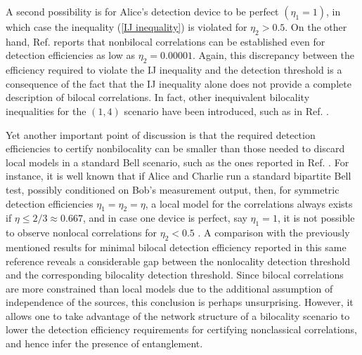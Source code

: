 \documentclass[aps,pra,reprint, superscriptaddress,showkeys]{revtex4-2}
\theoremstyle{plain}
\begin{document}
A second possibility is for Alice's detection device to be perfect $(\eta_1=1)$, in which case the inequality (\ref{IJ inequality}) is violated for $\eta_2>0.5$. On the other hand, Ref. \cite{boundingthesets} reports that nonbilocal correlations can be established even for detection efficiencies as low as $\eta_2 = 0.00001$. Again, this discrepancy between the efficiency required to violate the IJ inequality and the detection threshold is a consequence of the fact that the IJ inequality alone does not provide a complete description of bilocal correlations. In fact, other inequivalent bilocality inequalities for the $(1,4)$ scenario have been introduced, such as in Ref. \cite{tavakoli2021bilocal}. 

Yet another important point of discussion is that the required detection efficiencies to certify nonbilocality can be smaller than those needed to discard local models in a standard Bell scenario, such as the ones reported in Ref. \cite{massar2003violation}. For instance, it is well known that if Alice and Charlie run a standard bipartite Bell test, possibly conditioned on Bob's measurement output, then, for symmetric detection efficiencies $\eta_1=\eta_2=\eta$, a local model for the correlations always exists
if $\eta\leq2/3\approx0.667$, and in case one device is perfect, say $\eta_1=1$, it is not possible to observe nonlocal correlations for $\eta_2< 0.5$ \cite{boundingthesets} . A comparison with the previously mentioned results for minimal bilocal detection efficiency reported in this same reference reveals a considerable gap between the nonlocality detection threshold and the corresponding bilocality detection threshold. Since bilocal correlations are more constrained than local models due to the additional assumption of independence of the sources, this conclusion is perhaps unsurprising. However, it allows one to take advantage of the network structure of a bilocality scenario to lower the detection efficiency requirements for certifying nonclassical correlations, and hence infer the presence of entanglement.
\end{document}
